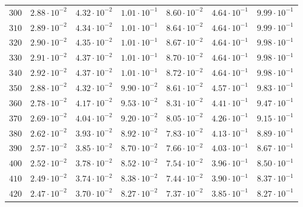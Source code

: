 \begin{table}[h]
\begin{tabular}{lcccccc}
$	300	$ & $	2.88 \cdot 10^{-2}	$ & $	4.32 \cdot 10^{-2}	$ & $	1.01 \cdot 10^{-1}	$ & $	8.60 \cdot 10^{-2}	$ & $	4.64 \cdot 10^{-1}	$ & $	9.99 \cdot 10^{-1}	$ \\
$	310	$ & $	2.89 \cdot 10^{-2}	$ & $	4.34 \cdot 10^{-2}	$ & $	1.01 \cdot 10^{-1}	$ & $	8.64 \cdot 10^{-2}	$ & $	4.64 \cdot 10^{-1}	$ & $	9.99 \cdot 10^{-1}	$ \\
$	320	$ & $	2.90 \cdot 10^{-2}	$ & $	4.35 \cdot 10^{-2}	$ & $	1.01 \cdot 10^{-1}	$ & $	8.67 \cdot 10^{-2}	$ & $	4.64 \cdot 10^{-1}	$ & $	9.98 \cdot 10^{-1}	$ \\
$	330	$ & $	2.91 \cdot 10^{-2}	$ & $	4.37 \cdot 10^{-2}	$ & $	1.01 \cdot 10^{-1}	$ & $	8.70 \cdot 10^{-2}	$ & $	4.64 \cdot 10^{-1}	$ & $	9.98 \cdot 10^{-1}	$ \\
$	340	$ & $	2.92 \cdot 10^{-2}	$ & $	4.37 \cdot 10^{-2}	$ & $	1.01 \cdot 10^{-1}	$ & $	8.72 \cdot 10^{-2}	$ & $	4.64 \cdot 10^{-1}	$ & $	9.98 \cdot 10^{-1}	$ \\
$	350	$ & $	2.88 \cdot 10^{-2}	$ & $	4.32 \cdot 10^{-2}	$ & $	9.90 \cdot 10^{-2}	$ & $	8.61 \cdot 10^{-2}	$ & $	4.57 \cdot 10^{-1}	$ & $	9.83 \cdot 10^{-1}	$ \\
$	360	$ & $	2.78 \cdot 10^{-2}	$ & $	4.17 \cdot 10^{-2}	$ & $	9.53 \cdot 10^{-2}	$ & $	8.31 \cdot 10^{-2}	$ & $	4.41 \cdot 10^{-1}	$ & $	9.47 \cdot 10^{-1}	$ \\
$	370	$ & $	2.69 \cdot 10^{-2}	$ & $	4.04 \cdot 10^{-2}	$ & $	9.20 \cdot 10^{-2}	$ & $	8.05 \cdot 10^{-2}	$ & $	4.26 \cdot 10^{-1}	$ & $	9.15 \cdot 10^{-1}	$ \\
$	380	$ & $	2.62 \cdot 10^{-2}	$ & $	3.93 \cdot 10^{-2}	$ & $	8.92 \cdot 10^{-2}	$ & $	7.83 \cdot 10^{-2}	$ & $	4.13 \cdot 10^{-1}	$ & $	8.89 \cdot 10^{-1}	$ \\
$	390	$ & $	2.57 \cdot 10^{-2}	$ & $	3.85 \cdot 10^{-2}	$ & $	8.70 \cdot 10^{-2}	$ & $	7.66 \cdot 10^{-2}	$ & $	4.03 \cdot 10^{-1}	$ & $	8.67 \cdot 10^{-1}	$ \\
$	400	$ & $	2.52 \cdot 10^{-2}	$ & $	3.78 \cdot 10^{-2}	$ & $	8.52 \cdot 10^{-2}	$ & $	7.54 \cdot 10^{-2}	$ & $	3.96 \cdot 10^{-1}	$ & $	8.50 \cdot 10^{-1}	$ \\
$	410	$ & $	2.49 \cdot 10^{-2}	$ & $	3.74 \cdot 10^{-2}	$ & $	8.38 \cdot 10^{-2}	$ & $	7.44 \cdot 10^{-2}	$ & $	3.90 \cdot 10^{-1}	$ & $	8.37 \cdot 10^{-1}	$ \\
$	420	$ & $	2.47 \cdot 10^{-2}	$ & $	3.70 \cdot 10^{-2}	$ & $	8.27 \cdot 10^{-2}	$ & $	7.37 \cdot 10^{-2}	$ & $	3.85 \cdot 10^{-1}	$ & $	8.27 \cdot 10^{-1}	$ \\

\end{tabular}
\end{table}
